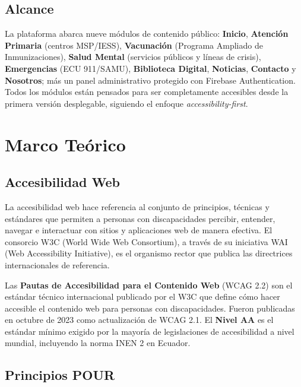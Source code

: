 \documentclass[12pt, a4paper]{report}
\begin{document}
\section{Alcance}

La plataforma abarca nueve módulos de contenido público: \textbf{Inicio}, \textbf{Atención Primaria} (centros MSP/IESS), \textbf{Vacunación} (Programa Ampliado de Inmunizaciones), \textbf{Salud Mental} (servicios públicos y líneas de crisis), \textbf{Emergencias} (ECU 911/SAMU), \textbf{Biblioteca Digital}, \textbf{Noticias}, \textbf{Contacto} y \textbf{Nosotros}; más un panel administrativo protegido con Firebase Authentication. Todos los módulos están pensados para ser completamente accesibles desde la primera versión desplegable, siguiendo el enfoque \textit{accessibility-first}.

\chapter{Marco Teórico}

\section{Accesibilidad Web}

La accesibilidad web hace referencia al conjunto de principios, técnicas y estándares que permiten a personas con discapacidades percibir, entender, navegar e interactuar con sitios y aplicaciones web de manera efectiva. El consorcio W3C (World Wide Web Consortium), a través de su iniciativa WAI (Web Accessibility Initiative), es el organismo rector que publica las directrices internacionales de referencia.

\begin{infobox}
Las \textbf{Pautas de Accesibilidad para el Contenido Web} (WCAG 2.2) son el estándar técnico internacional publicado por el W3C que define cómo hacer accesible el contenido web para personas con discapacidades. Fueron publicadas en octubre de 2023 como actualización de WCAG 2.1. El \textbf{Nivel AA} es el estándar mínimo exigido por la mayoría de legislaciones de accesibilidad a nivel mundial, incluyendo la norma INEN 2 en Ecuador.
\end{infobox}

\section{Principios POUR}
\end{document}

